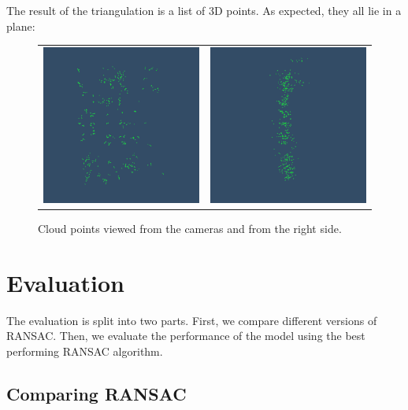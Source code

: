 \documentclass[11pt]{report}
\begin{document}
The result of the triangulation is a list of 3D points. As expected, they all lie in a plane:
\begin{figure}[H]
\centering
\begin{tabular}{cc}
\includegraphics[scale=0.5]{images/cloud1.png} &
\includegraphics[scale=0.5]{images/cloud2.png} \\
\end{tabular}
\caption{Cloud points viewed from the cameras and from the right side.}
\end{figure}


\chapter{Evaluation}

The evaluation is split into two parts. First, we compare different versions of RANSAC. Then, we evaluate the performance of the model using the best performing RANSAC algorithm.

\section{Comparing RANSAC}
\end{document}

